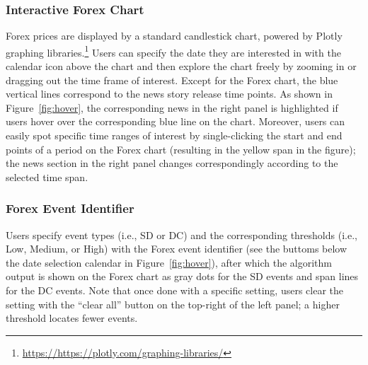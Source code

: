 \documentclass[runningheads]{llncs}
\begin{document}
\subsubsection{Interactive Forex Chart}
\vspace{-0.2cm}
Forex prices are displayed by a standard candlestick chart, powered by
Plotly graphing
libraries.\footnote{\url{https://https://plotly.com/graphing-libraries/}}
Users can specify the date they are interested in with the calendar icon above
the chart and then explore the chart freely by zooming in or dragging out the
time frame of interest.
Except for the Forex chart, the blue vertical lines correspond to the news story
release time points. 
As shown in Figure~\ref{fig:hover}, the corresponding news in the right panel
is highlighted if users hover over the corresponding blue line on the chart.
Moreover, users can easily spot specific time ranges of interest
by single-clicking the start and end points of a period on the Forex chart
(resulting in the yellow span in the figure); the news section in the right
panel changes correspondingly according to the selected time span.

\vspace{-0.4cm}
\subsubsection{Forex Event Identifier}
\vspace{-0.2cm}
Users specify event types (i.e., SD or DC)  and the corresponding thresholds (i.e., Low, Medium, or High) with the Forex event identifier (see the buttoms below the date selection calendar in Figure~\ref{fig:hover}), after which the algorithm output is shown on the Forex chart as
gray dots for the SD events and span lines for the DC events.
Note that once done with a specific setting, users clear the setting with
the ``clear all'' button on the top-right of the left panel;
a higher threshold locates fewer events.
\end{document}
